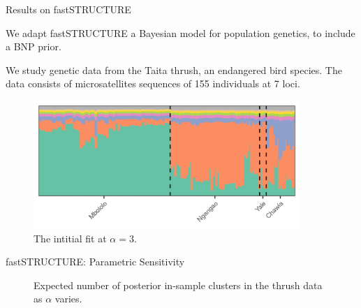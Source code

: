 \begin{frame}{Results on fastSTRUCTURE \citep{raj:2014:faststructure}}

We adapt fastSTRUCTURE
a Bayesian model for population genetics, to include a BNP prior.


We study genetic data from the Taita thrush, an endangered bird species.
The data consists of microsatellites sequences of 155 individuals at 7 loci.

\begin{figure}[!h]
\centering
\includegraphics[width = 0.9\textwidth]{./figure/structure_init-1.png}
\caption*{The intitial fit at $\alpha = 3$. }
\end{figure}
\end{frame}


\begin{frame}{fastSTRUCTURE: Parametric Sensitivity}
  \begin{figure}[!h]
    \centering
    \caption*{Expected number of posterior in-sample clusters in the thrush data as $\alpha$ varies.}
  \end{figure}

\end{frame}

